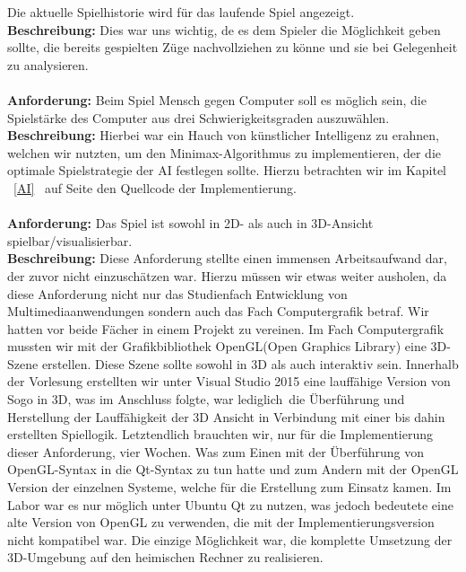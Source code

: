 \documentclass[a4paper]{scrartcl}
\begin{document}
Die aktuelle Spielhistorie wird für das laufende Spiel angezeigt.
\\ 
\textbf{Beschreibung:} Dies war uns wichtig, de es dem Spieler die Möglichkeit geben sollte, die bereits gespielten Züge nachvollziehen zu könne und sie bei Gelegenheit zu analysieren.
\\
\\
\textbf{Anforderung:} 
Beim Spiel Mensch gegen Computer soll es möglich sein, die Spielstärke des Computer aus drei Schwierigkeitsgraden auszuwählen.
\\
\textbf{Beschreibung:} Hierbei war ein Hauch von künstlicher Intelligenz zu erahnen, welchen wir nutzten, um den Minimax-Algorithmus zu implementieren, der die optimale Spielstrategie der AI festlegen sollte. Hierzu betrachten wir im Kapitel ~\ref{AI} \glqq{}\grqq \ auf Seite \pageref{AI} den Quellcode der Implementierung.
\\
\\
\textbf{Anforderung:} 
Das Spiel ist sowohl in 2D- als auch in 3D-Ansicht spielbar/visualisierbar.
\\
\textbf{Beschreibung:} Diese Anforderung stellte einen immensen Arbeitsaufwand dar, der zuvor nicht einzuschätzen war. Hierzu müssen wir etwas weiter ausholen, da diese Anforderung nicht nur das Studienfach Entwicklung von Multimediaanwendungen sondern auch das Fach Computergrafik betraf. Wir hatten vor beide Fächer in einem Projekt zu vereinen. Im Fach Computergrafik mussten wir mit der Grafikbibliothek OpenGL(Open Graphics Library) eine 3D-Szene erstellen. Diese Szene sollte sowohl in 3D als auch interaktiv sein. Innerhalb der Vorlesung erstellten wir unter Visual Studio 2015 eine lauffähige Version von Sogo in 3D, was im Anschluss folgte, war \glqq lediglich\grqq \ die Überführung und Herstellung der Lauffähigkeit der 3D Ansicht in Verbindung mit einer bis dahin erstellten Spiellogik. Letztendlich brauchten wir, nur für die  Implementierung dieser Anforderung, vier Wochen. Was zum Einen mit der Überführung von OpenGL-Syntax in die Qt-Syntax zu tun hatte und zum Andern mit der OpenGL Version der einzelnen Systeme, welche für die Erstellung zum Einsatz kamen. Im Labor war es nur möglich unter Ubuntu Qt zu nutzen, was jedoch bedeutete eine alte Version von OpenGL zu verwenden, die mit der Implementierungsversion nicht kompatibel war. Die einzige Möglichkeit war, die komplette Umsetzung der 3D-Umgebung auf den heimischen Rechner zu realisieren.
\\ 
\\
\end{document}
